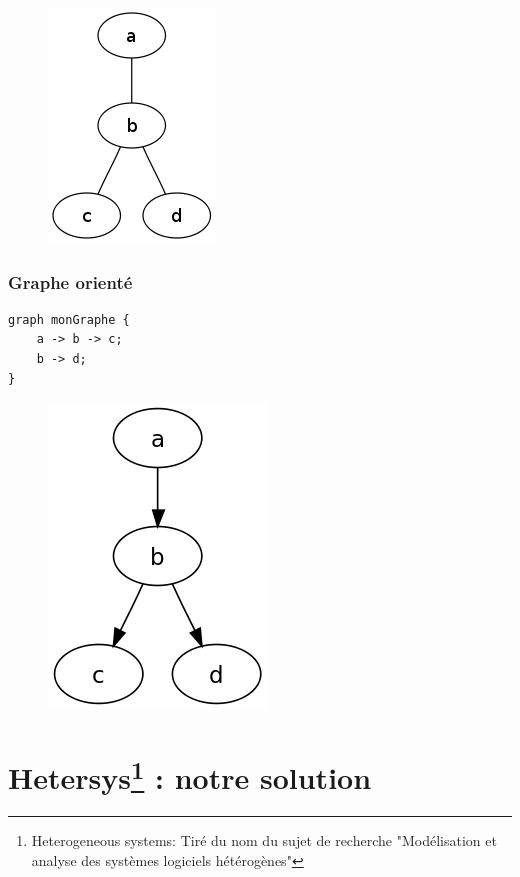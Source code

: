 \documentclass[12pt,a4paper]{report}
\begin{document}
\begin{figure}[!h]
  \centering
  \includegraphics[scale=0.3]{ressources/grapheNO.png}
\end{figure}

\subsection{Graphe orienté}

\begin{lstlisting}
graph monGraphe {
    a -> b -> c;
    b -> d;
}
\end{lstlisting}

\begin{figure}[!h]
  \centering
  \includegraphics[scale=0.3]{ressources/grapheO.png}
\end{figure}

\newpage
\chapter[Hetersys : notre solution]{Hetersys\footnote{Heterogeneous systems: Tiré du nom du sujet de recherche "Modélisation et analyse des systèmes logiciels hétérogènes"} : notre solution}
\end{document}
